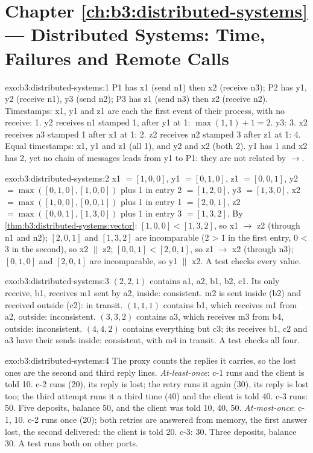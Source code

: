 \section*{Chapter \ref{ch:b3:distributed-systems} --- Distributed Systems: Time, Failures and Remote Calls}

\begin{solution}{exo:b3:distributed-systems:1}
P1 has x1 (send n1) then x2 (receive n3); P2 has y1, y2 (receive n1), y3 (send n2); P3 has z1 (send n3) then z2 (receive n2). Timestamps: x1, y1 and z1 are each the first event of their process, with no receive: 1. y2 receives n1 stamped 1, after y1 at 1: $\max(1, 1) + 1 = 2$. y3: 3. x2 receives n3 stamped 1 after x1 at 1: 2. z2 receives n2 stamped 3 after z1 at 1: 4. Equal timestamps: x1, y1 and z1 (all 1), and y2 and x2 (both 2). y1 has 1 and x2 has 2, yet no chain of messages leads from y1 to P1: they are not related by $\to$.
\end{solution}

\begin{solution}{exo:b3:distributed-systems:2}
x1 $= [1, 0, 0]$, y1 $= [0, 1, 0]$, z1 $= [0, 0, 1]$, y2 $= \max([0, 1, 0], [1, 0, 0])$ plus 1 in entry 2 $= [1, 2, 0]$, y3 $= [1, 3, 0]$, x2 $= \max([1, 0, 0], [0, 0, 1])$ plus 1 in entry 1 $= [2, 0, 1]$, z2 $= \max([0, 0, 1], [1, 3, 0])$ plus 1 in entry 3 $= [1, 3, 2]$. By \cref{thm:b3:distributed-systems:vector}: $[1, 0, 0] < [1, 3, 2]$, so x1 $\to$ z2 (through n1 and n2); $[2, 0, 1]$ and $[1, 3, 2]$ are incomparable (2 > 1 in the first entry, 0 < 3 in the second), so x2 $\parallel$ z2; $[0, 0, 1] < [2, 0, 1]$, so z1 $\to$ x2 (through n3); $[0, 1, 0]$ and $[2, 0, 1]$ are incomparable, so y1 $\parallel$ x2. A test checks every value.
\end{solution}

\begin{solution}{exo:b3:distributed-systems:3}
$(2, 2, 1)$ contains a1, a2, b1, b2, c1. Its only receive, b1, receives m1 sent by a2, inside: consistent. m2 is sent inside (b2) and received outside (c2): in transit. $(1, 1, 1)$ contains b1, which receives m1 from a2, outside: inconsistent. $(3, 3, 2)$ contains a3, which receives m3 from b4, outside: inconsistent. $(4, 4, 2)$ contains everything but c3; its receives b1, c2 and a3 have their sends inside: consistent, with m4 in transit. A test checks all four.
\end{solution}

\begin{solution}{exo:b3:distributed-systems:4}
The proxy counts the replies it carries, so the lost ones are the second and third reply lines. \emph{At-least-once}: c-1 runs and the client is told 10. c-2 runs (20), its reply is lost; the retry runs it again (30), its reply is lost too; the third attempt runs it a third time (40) and the client is told 40. c-3 runs: 50. Five deposits, balance 50, and the client was told 10, 40, 50. \emph{At-most-once}: c-1, 10. c-2 runs once (20); both retries are answered from memory, the first answer lost, the second delivered: the client is told 20. c-3: 30. Three deposits, balance 30. A test runs both on other ports.
\end{solution}


